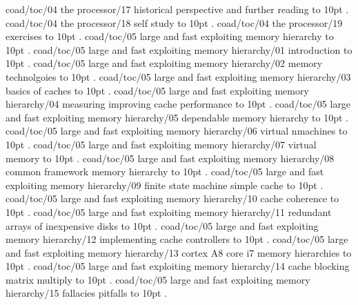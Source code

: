 \smallskip
coad/toc/04 the processor/17 historical perspective and further reading \leaders\hbox to 10pt {\hss.\hss}  \hfill {}
\smallskip
coad/toc/04 the processor/18 self study \leaders\hbox to 10pt {\hss.\hss}  \hfill {}
\smallskip
coad/toc/04 the processor/19 exercises \leaders\hbox to 10pt {\hss.\hss}  \hfill {}
\smallskip
coad/toc/05 large and fast exploiting memory hierarchy \leaders\hbox to 10pt {\hss.\hss}  \hfill {}
\smallskip
coad/toc/05 large and fast exploiting memory hierarchy/01 introduction \leaders\hbox to 10pt {\hss.\hss}  \hfill {}
\smallskip
coad/toc/05 large and fast exploiting memory hierarchy/02 memory technolgoies \leaders\hbox to 10pt {\hss.\hss}  \hfill {}
\smallskip
coad/toc/05 large and fast exploiting memory hierarchy/03 basics of caches \leaders\hbox to 10pt {\hss.\hss}  \hfill {}
\smallskip
coad/toc/05 large and fast exploiting memory hierarchy/04 measuring improving cache performance \leaders\hbox to 10pt {\hss.\hss}  \hfill {}
\smallskip
coad/toc/05 large and fast exploiting memory hierarchy/05 dependable memory hierarchy \leaders\hbox to 10pt {\hss.\hss}  \hfill {}
\smallskip
coad/toc/05 large and fast exploiting memory hierarchy/06 virtual nmachines \leaders\hbox to 10pt {\hss.\hss}  \hfill {}
\smallskip
coad/toc/05 large and fast exploiting memory hierarchy/07 virtual memory \leaders\hbox to 10pt {\hss.\hss}  \hfill {}
\smallskip
coad/toc/05 large and fast exploiting memory hierarchy/08 common framework memory hierarchy \leaders\hbox to 10pt {\hss.\hss}  \hfill {}
\smallskip
coad/toc/05 large and fast exploiting memory hierarchy/09 finite state machine simple cache \leaders\hbox to 10pt {\hss.\hss}  \hfill {}
\smallskip
coad/toc/05 large and fast exploiting memory hierarchy/10 cache coherence \leaders\hbox to 10pt {\hss.\hss}  \hfill {}
\smallskip
coad/toc/05 large and fast exploiting memory hierarchy/11 redundant arrays of inexpensive disks \leaders\hbox to 10pt {\hss.\hss}  \hfill {}
\smallskip
coad/toc/05 large and fast exploiting memory hierarchy/12 implementing cache controllers \leaders\hbox to 10pt {\hss.\hss}  \hfill {}
\smallskip
coad/toc/05 large and fast exploiting memory hierarchy/13 cortex A8 core i7 memory hierarchies \leaders\hbox to 10pt {\hss.\hss}  \hfill {}
\smallskip
coad/toc/05 large and fast exploiting memory hierarchy/14 cache blocking matrix multiply \leaders\hbox to 10pt {\hss.\hss}  \hfill {}
\smallskip
coad/toc/05 large and fast exploiting memory hierarchy/15 fallacies pitfalls \leaders\hbox to 10pt {\hss.\hss}  \hfill {}
